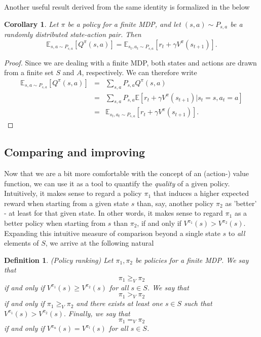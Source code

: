 \documentclass[11pt]{article} %
\newtheorem{cor}{Corollary}
\newtheorem{defn}{Definition}
\begin{document}
Another useful result derived from the same identity is formalized in the below

\begin{cor}
	Let $\pi$ be a policy for a finite MDP, and let $(s,a) \sim P_{s,a}$ be a randomly distributed state-action pair. Then $$\mathbb{E}_{s, a \sim P_{s,a}}[Q^{\pi}(s,a)] = \mathbb{E}_{s_t, a_t \sim P_{s,a}}[r_t + \gamma V^{\pi}(s_{t+1})].$$
\end{cor}

\begin{proof}
	Since we are dealing with a finite MDP, both states and actions are drawn from a finite set $S$ and $A$, respectively. We can therefore write
	\[
		\begin{array}{rll}
			\mathbb{E}_{s,a \sim  P_{s,a}}[Q^{\pi}(s,a)] 	& = & \sum_{s,a} P_{s,a} Q^{\pi}(s,a) \\
				& = & \sum_{s,a} P_{s,a} \mathbb{E}[r_t + \gamma V^{\pi}(s_{t+1}) | s_t = s, a_t = a] \\
				& = & \mathbb{E}_{s_t,a_t \sim P_{s,a}}[r_t + \gamma V^{\pi}(s_{t+1})].
		\end{array}
	\]
\end{proof}

\subsection{Comparing and improving}

Now that we are a bit more comfortable with the concept of an (action-) value function, we can use it as a tool to quantify the \textit{quality} of a given policy. Intuitively, it makes sense to regard a policy $\pi_1$ that induces a higher expected reward when starting from a given state $s$ than, say, another policy $\pi_2$ as 'better'  - at least for that given state. In other words, it makes sense to regard $\pi_1$ as a better policy when starting from $s$ than $\pi_2$, if and only if $V^{\pi_1}(s) > V^{\pi_2}(s)$. Expanding this intuitive measure of comparison beyond a single state $s$ to \textit{all} elements of $S$, we arrive at the following natural

\begin{defn}{(Policy ranking)}
Let $\pi_1, \pi_2$ be policies for a finite MDP. We say that $$\pi_1 \ge_V \pi_2$$ if and only if $V^{\pi_1}(s) \ge V^{\pi_2}(s)$ for all $s \in S$. We say that $$\pi_1 >_V \pi_2$$ if and only if  $\pi_1 \ge_V \pi_2$ and there exists at least one $s \in S$ such that $V^{\pi_1}(s) > V^{\pi_2}(s).$ Finally, we say that $$\pi_1 =_V \pi_2$$ if and only if $V^{\pi_u}(s) = V^{\pi_l}(s)$ for all $s \in S$.
\end{defn}
\end{document}
